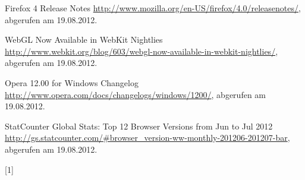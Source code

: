 \begin{thebibliography}{99}
    Firefox 4 Release Notes
    \url{http://www.mozilla.org/en-US/firefox/4.0/releasenotes/}, abgerufen am 19.08.2012.

    WebGL Now Available in WebKit Nightlies
    \url{http://www.webkit.org/blog/603/webgl-now-available-in-webkit-nightlies/}, abgerufen am 19.08.2012.

    Opera 12.00 for Windows Changelog
    \url{http://www.opera.com/docs/changelogs/windows/1200/}, abgerufen am 19.08.2012.



    StatCounter Global Stats: Top 12 Browser Versions from Jun to Jul 2012
    \url{http://gs.statcounter.com/#browser_version-ww-monthly-201206-201207-bar}, abgerufen am 19.08.2012.







\end{thebibliography}


[1] 